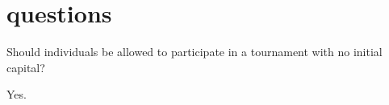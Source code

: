 


\section{questions}

Should individuals be allowed to participate in a tournament with no initial capital?

Yes. 

